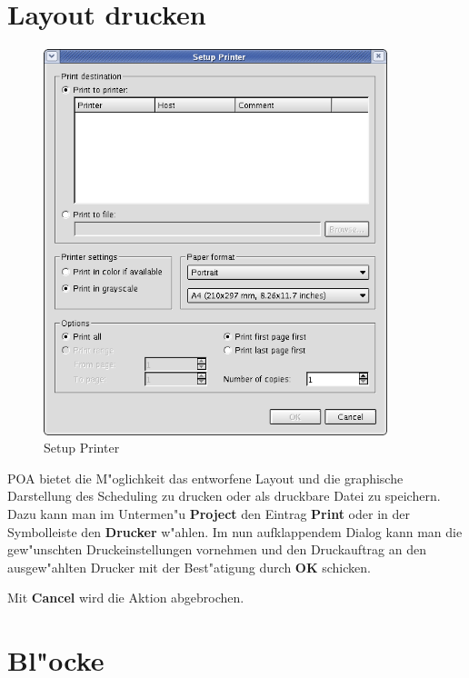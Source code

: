\documentclass[a4paper,titlepage,12pt,ngerman]{scrbook}
\begin{document}
\section{Layout drucken}
\begin{figure}[htbp]

\begin{center}

\includegraphics[width=10cm]{Printer}

\caption{Setup Printer}\label{test}

\end{center}

\end{figure}
POA bietet die M"oglichkeit das entworfene Layout und die graphische Darstellung des Scheduling zu drucken oder als druckbare Datei zu speichern.
Dazu kann man im Untermen"u {\bf Project} den Eintrag {\bf Print} oder in der Symbolleiste den {\bf Drucker} w"ahlen. Im nun aufklappendem Dialog kann man die gew"unschten Druckeinstellungen vornehmen und den Druckauftrag an den ausgew"ahlten Drucker mit der Best"atigung durch {\bf OK} schicken.\par
Mit {\bf Cancel} wird die Aktion abgebrochen.\par






\newpage
\section{Bl"ocke}
\end{document}
